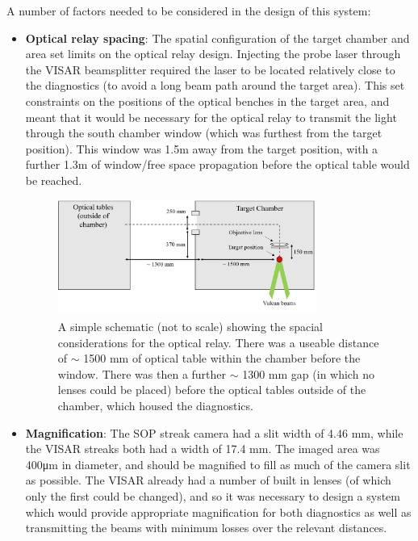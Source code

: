 A number of factors needed to be considered in the design of this system:

\begin{itemize}
    \item \textbf{Optical relay spacing}: The spatial configuration of the target chamber and area set limits on the optical relay design. Injecting the probe laser through the VISAR beamsplitter required the laser to be located relatively close to the diagnostics (to avoid a long beam path around the target area). This set constraints on the positions of the optical benches in the target area, and meant that it would be necessary for the optical relay to transmit the light through the south chamber window (which was furthest from the target position). This window was 1.5m away from the target position, with a further 1.3m of window/free space propagation before the optical table would be reached.
    
  \begin{figure}
  \centering
\includegraphics[width=0.8\textwidth]{figures/Experiment/Experiment Spacing.png}%
\caption{\label{fig:Experiment} A simple schematic (not to scale) showing the spacial considerations for the optical relay. There was a useable distance of $\sim$ 1500 mm of optical table within the chamber before the window. There was then a further $\sim$ 1300 mm gap (in which no lenses could be placed) before the optical tables outside of the chamber, which housed the diagnostics. }
\end{figure}  
    
    \item \textbf{Magnification}: The SOP streak camera had a slit width of 4.46 \unit{\milli\meter}, while the VISAR streaks both had a width of 17.4 \unit{\milli\meter}. The imaged area was 400\unit{\micro\meter} in diameter, and should be magnified to fill as much of the camera slit as possible. The VISAR already had a number of built in lenses (of which only the first could be changed), and so it was necessary to design a system which would provide appropriate magnification for both diagnostics as well as transmitting the beams with minimum losses over the relevant distances.
    

\end{itemize}
